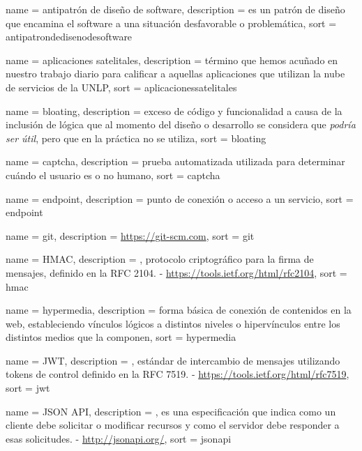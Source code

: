 \newpage
{} {
  name = {antipatrón de diseño de software},
  description = {es un patrón de diseño que encamina el software a una situación desfavorable o problemática},
  sort = {antipatrondedisenodesoftware}
}

 {
  name = {aplicaciones satelitales},
  description = {término que hemos acuñado en nuestro trabajo diario para calificar a aquellas aplicaciones que utilizan la nube de servicios de la UNLP},
  sort = {aplicacionessatelitales}
}

 {
  name = {bloating},
  description = {exceso de código y funcionalidad a causa de la inclusión de lógica que al momento del diseño o desarrollo se considera que \textit{podría ser útil}, pero que en la práctica no se utiliza},
  sort = {bloating}
}

 {
  name = {captcha},
  description = {prueba automatizada utilizada para determinar cuándo el usuario es o no humano},
  sort = {captcha}
}

 {
  name = {endpoint},
  description = {punto de conexión o acceso a un servicio},
  sort = {endpoint}
}

 {
  name = {git},
  description = {\url{https://git-scm.com}},
  sort = {git}
}

 {
  name = {HMAC},
  description = {, protocolo criptográfico para la firma de mensajes, definido en la RFC 2104. - \url{https://tools.ietf.org/html/rfc2104}},
  sort = {hmac}
}

 {
  name = {hypermedia},
  description = {forma básica de conexión de contenidos en la web, estableciendo vínculos lógicos a distintos niveles o hipervínculos entre los distintos medios que la componen},
  sort = {hypermedia}
}

 {
  name = {JWT},
  description = {, estándar de intercambio de mensajes utilizando tokens de control definido en la RFC 7519. - \url{https://tools.ietf.org/html/rfc7519}},
  sort = {jwt}
}

 {
  name = {JSON API},
  description = {, es una especificación que indica como un cliente debe solicitar o modificar recursos y como el servidor debe responder a esas solicitudes. - \url{http://jsonapi.org/}},
  sort = {jsonapi}
}

